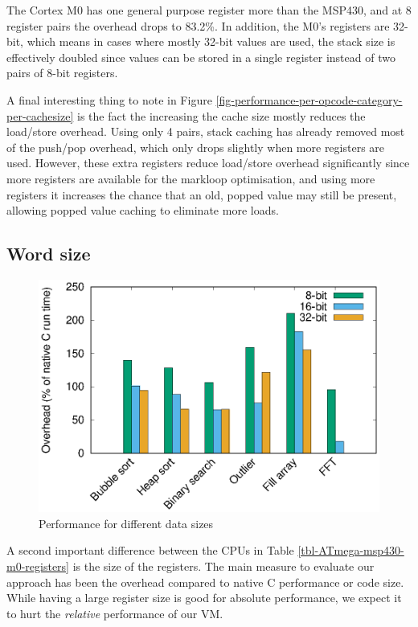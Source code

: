 The Cortex M0 has one general purpose register more than the MSP430, and at 8 register pairs the overhead drops to 83.2\%. In addition, the M0's registers are 32-bit, which means in cases where mostly 32-bit values are used, the stack size is effectively doubled since values can be stored in a single register instead of two pairs of 8-bit registers.

A final interesting thing to note in Figure \ref{fig-performance-per-opcode-category-per-cachesize} is the fact the increasing the cache size mostly reduces the load/store overhead. Using only 4 pairs, stack caching has already removed most of the push/pop overhead, which only drops slightly when more registers are used. However, these extra registers reduce load/store overhead significantly since more registers are available for the markloop optimisation, and using more registers it increases the chance that an old, popped value may still be present, allowing popped value caching to eliminate more loads.

\subsection{Word size}
\label{sec-evaluation-other-platforms-word-size}

\begin{figure}
\centering
\includegraphics[width=\mygraphsize]{8_16_32_bit.eps}
\caption{Performance for different data sizes}
\label{fig-performance-8-16-32-bit}
\end{figure}



A second important difference between the CPUs in Table \ref{tbl-ATmega-msp430-m0-registers} is the size of the registers. The main measure to evaluate our approach has been the overhead compared to native C performance or code size. While having a large register size is good for absolute performance, we expect it to hurt the \emph{relative} performance of our VM.

